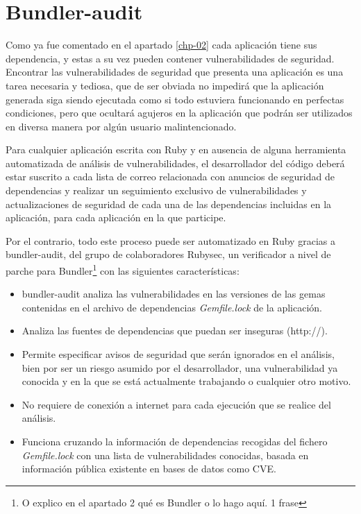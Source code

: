

\section{Bundler-audit}

Como ya fue comentado en el apartado \ref{chp-02}  cada aplicación tiene sus dependencia, y estas a su vez pueden contener vulnerabilidades de seguridad. Encontrar las vulnerabilidades de seguridad que presenta una aplicación es una tarea necesaria y tediosa, que de ser obviada no impedirá que la aplicación generada siga siendo ejecutada como si todo estuviera funcionando en perfectas condiciones, pero que ocultará agujeros en la aplicación que podrán ser utilizados en diversa manera por algún usuario malintencionado.

Para cualquier aplicación escrita con Ruby y en ausencia de alguna herramienta automatizada de análisis de vulnerabilidades, el desarrollador del código deberá estar suscrito a cada lista de correo relacionada con anuncios de seguridad de dependencias y realizar un seguimiento exclusivo de vulnerabilidades y actualizaciones de seguridad de cada una de las dependencias incluidas en la aplicación, para cada aplicación en la que participe\cite{prescott2015}.

Por el contrario, todo este proceso puede ser automatizado en Ruby gracias a bundler-audit\cite{bundleaudit2017}, del grupo de colaboradores Rubysec, un verificador a nivel de parche para Bundler\footnote{O explico en el apartado 2 qué es Bundler o lo hago aquí. 1 frase} con las siguientes características:

\begin{itemize}
	\item bundler-audit analiza las vulnerabilidades en las versiones de las gemas contenidas en el archivo de dependencias \textit{Gemfile.lock} de la aplicación.
	\item Analiza las fuentes de dependencias que puedan ser inseguras (http://).
	\item Permite especificar avisos de seguridad que serán ignorados en el análisis, bien por ser un riesgo asumido por el desarrollador, una vulnerabilidad ya conocida y en la que se está actualmente trabajando o cualquier otro motivo.
	\item No requiere de conexión a internet para cada ejecución que se realice del análisis.
	\item Funciona cruzando la información de dependencias recogidas del fichero \textit{Gemfile.lock} con una lista de vulnerabilidades conocidas\cite{advisorydb2017}, basada en información pública existente en bases de datos como \gls{CVE}.
\end{itemize}

